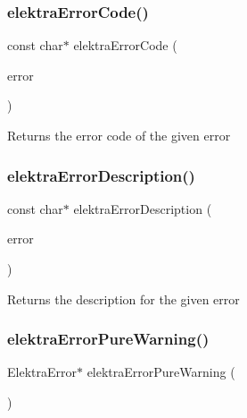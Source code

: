 \subsubsection{\texorpdfstring{elektraErrorCode()}{elektraErrorCode()}}
{\footnotesize\ttfamily const char$\ast$ elektra\+Error\+Code (\begin{DoxyParamCaption}\item[{const Elektra\+Error $\ast$}]{error }\end{DoxyParamCaption})}

\begin{DoxyReturn}{Returns}
the error code of the given error 
\end{DoxyReturn}
\mbox{\label{group__highlevel_ga781cda83af3981a55321e7c613afbef0}} 
\subsubsection{\texorpdfstring{elektraErrorDescription()}{elektraErrorDescription()}}
{\footnotesize\ttfamily const char$\ast$ elektra\+Error\+Description (\begin{DoxyParamCaption}\item[{const Elektra\+Error $\ast$}]{error }\end{DoxyParamCaption})}

\begin{DoxyReturn}{Returns}
the description for the given error 
\end{DoxyReturn}
\mbox{\label{group__highlevel_ga4895fb4c40822a11219846b189395db0}} 
\subsubsection{\texorpdfstring{elektraErrorPureWarning()}{elektraErrorPureWarning()}}
{\footnotesize\ttfamily Elektra\+Error$\ast$ elektra\+Error\+Pure\+Warning (\begin{DoxyParamCaption}\item[{void}]{ }\end{DoxyParamCaption})}



